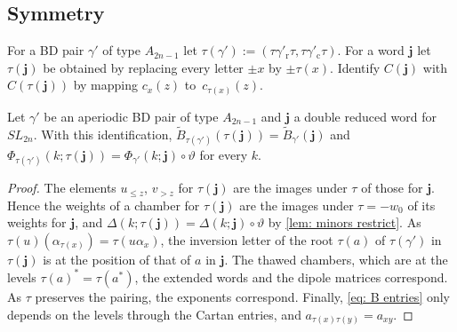 \documentclass[a4paper]{amsart}
\numberwithin{equation}{section}
\theoremstyle{definition}
\theoremstyle{remark}
\newcommand{\bfj}{\mathbf{j}}
\newcommand{\tB}{\widetilde{B}}
\newcommand{\vt}{\vartheta}
\newcommand{\rr}{\mathrm{r}}
\newcommand{\cc}{\mathrm{c}}
\newcommand{\SL}{SL_{2n}}
\begin{document}
\subsection{Symmetry}
For a BD pair $\gamma'$ of type $A_{2n-1}$ let $\tau(\gamma'):=(\tau\gamma'_{\rr}\tau,\tau\gamma'_{\cc}\tau)$.
For a word $\bfj$ let $\tau(\bfj)$ be obtained by replacing every letter $\pm x$ by $\pm\tau(x)$.
Identify $C(\bfj)$ with $C(\tau(\bfj))$ by mapping $c_x(z)$ to~$c_{\tau(x)}(z)$.

\begin{lemma}
  \label{lem: naturality}
  Let $\gamma'$ be an aperiodic BD pair of type $A_{2n-1}$ and $\bfj$ a double reduced word for $\SL$.
  With this identification, $\tB_{\tau(\gamma')}(\tau(\bfj))=\tB_{\gamma'}(\bfj)$ and $\Phi_{\tau(\gamma')}(k;\tau(\bfj))=\Phi_{\gamma'}(k;\bfj)\circ\vt$ for every $k$.
\end{lemma}
\begin{proof}
  The elements $u_{\le z}$, $v_{>z}$ for $\tau(\bfj)$ are the images under $\tau$ of those for $\bfj$.
  Hence the weights of a chamber for $\tau(\bfj)$ are the images under $\tau=-w_0$ of its weights for $\bfj$, and $\Delta(k;\tau(\bfj))=\Delta(k;\bfj)\circ\vt$ by \cref{lem: minors restrict}.
  As $\tau(u)(\alpha_{\tau(x)})=\tau(u\alpha_x)$, the inversion letter of the root $\tau(a)$ of $\tau(\gamma')$ in $\tau(\bfj)$ is at the position of that of $a$ in $\bfj$.
  The thawed chambers, which are at the levels $\tau(a)^*=\tau(a^*)$, the extended words and the dipole matrices correspond.
  As $\tau$ preserves the pairing, the exponents correspond.
  Finally, \eqref{eq: B entries} only depends on the levels through the Cartan entries, and $a_{\tau(x)\tau(y)}=a_{xy}$.
\end{proof}
\end{document}
